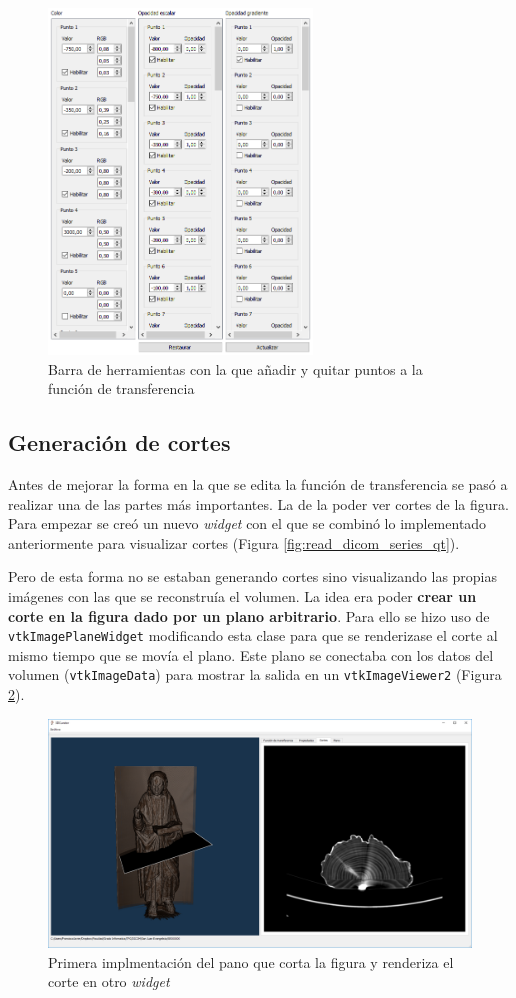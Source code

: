 \begin{figure}[H]
	\centering
	\includegraphics[width=7cm]{imagenes/gui_inicial_tf}
	\caption{Barra de herramientas con la que añadir y quitar puntos a la función de transferencia}
	\label{fig:gui_inicial_tf}
\end{figure}

\subsection{Generación de cortes}

Antes de mejorar la forma en la que se edita la función de transferencia se pasó a realizar una de las partes más importantes. La de la poder ver cortes de la figura. Para empezar se creó un nuevo \textit{widget} con el que se combinó lo implementado anteriormente para visualizar cortes (Figura \ref{fig:read_dicom_series_qt}). 

Pero de esta forma no se estaban generando cortes sino visualizando las propias imágenes con las que se reconstruía el volumen. La idea era poder \textbf{crear un corte en la figura dado por un plano arbitrario}. Para ello se hizo uso de \texttt{vtkImagePlaneWidget} modificando esta clase para que se renderizase el corte al mismo tiempo que se movía el plano. Este plano se conectaba con los datos del volumen (\texttt{vtkImageData}) para mostrar la salida en un \texttt{vtkImageViewer2} (Figura \ref{fig:primer_plano_de_corte}).

\begin{figure}[H]
	\centering
	\includegraphics[width=12cm]{imagenes/primer_plano_de_corte}
	\caption{Primera implmentación del pano que corta la figura y renderiza el corte en otro \textit{widget}}
	\label{fig:primer_plano_de_corte}
\end{figure}

